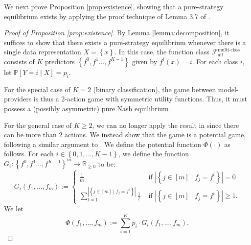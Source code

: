 \documentclass[letterpaper,11pt]{article}
\theoremstyle{plain}
\begin{document}
We next prove Proposition \ref{prop:existence}, showing that a pure-strategy equilibrium exists by applying the proof technique of Lemma 3.7 of \citet{BT19}. 
\begin{proof}[Proof of Proposition \ref{prop:existence}]
By Lemma \ref{lemma:decomposition}, it suffices to show that there exists a pure-strategy equilibrium whenever there is a single data representation $X = \left\{x\right\}$. In this case, the function class $\mathcal{F}^{\text{multi-class}}_{\text{all}}$ consists of $K$ predictors $\left\{f^0, f^1 \ldots, f^{K-1}\right\}$ given by $f^i(x) = i$. For each class $i$, let $\mathbb{P}[Y = i \mid X] = p_i$. 

For the special case of $K = 2$ (binary classification), the game between model-providers is thus a 2-action game with symmetric utility functions. Thus, it must possess a (possibly asymmetric) pure Nash equilibrium \citep{C04}. 

For the general case of $K \ge 2$, we can no longer apply the result in \citep{C04} since there can be more than 2 actions. We instead show that the game is a potential game, following a similar argument to \citet{BT19}. We define the potential function $\Phi(\cdot)$ as follows. For each $i \in \left\{0, 1, \ldots, K-1\right\}$, we define the function $G_i: \left\{f^0, f^1 \ldots, f^{K-1}\right\}^m \rightarrow \mathbb{R}_{\ge 0}$ to be:
\[
G_i(f_1, \ldots, f_m) := 
\begin{cases}
 \frac{1}{m}  &\text{ if } |\left\{j \in [m] \mid f_j = f^i\right\}| = 0 \\
  \sum_{l=1}^{|\left\{j \in [m] \mid f_j = f^i\right\}| } \frac{1}{l}  &\text{ if } |\left\{j \in [m] \mid f_j = f^i\right\}| \ge 1.
\end{cases}
\]
 We let 
\[\Phi(f_1, \ldots, f_m) := \sum_{i=1}^K p_i \cdot G_i(f_1, \ldots, f_m).\]


\end{proof}
\end{document}
